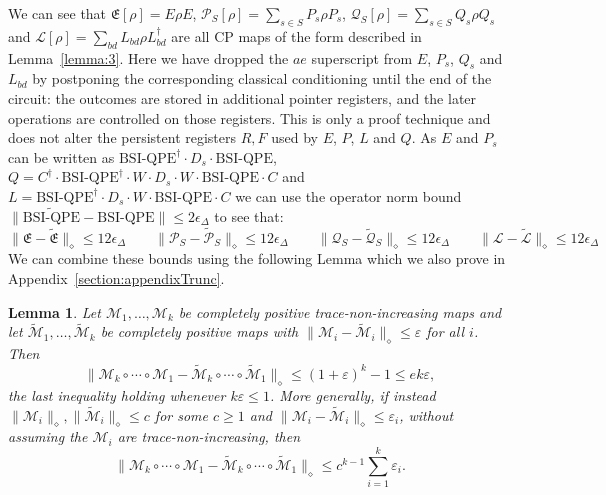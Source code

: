 \documentclass[aps,floatfix,10pt,amssymb,amsfont,amsmath,superscriptaddress,float,nofootinbib,longbibliography,nobalancelastpage,twocolumn]{revtex4-2}
\newtheorem{lemma}{Lemma}
\begin{document}
We can see that $\mathfrak{E}[\rho] =  E \rho E$, $\mathcal{P}_S[\rho] = \sum_{s\in S} P_s \rho P_s$, $\mathcal{Q}_S[\rho] = \sum_{s\in S} Q_s \rho Q_s$ and $\mathcal{L}[\rho] = \sum_{bd} L_{bd} \rho L^{\dagger}_{bd}$ are all CP maps of the form described in Lemma~\ref{lemma:3}. Here we have dropped the $ae$ superscript from $E$, $P_s$, $Q_s$ and $L_{bd}$ by postponing the corresponding classical conditioning until the end of the circuit: the outcomes are stored in additional pointer registers, and the later operations are controlled on those registers. This is only a proof technique and does not alter the persistent registers $R, F$ used by $E$, $P$, $L$ and $Q$. As $E$ and $P_s$ can be written as $\text{BSI-QPE}^{\dagger}\cdot D_s\cdot\text{BSI-QPE}$, $Q = C^{\dagger}\cdot\text{BSI-QPE}^{\dagger}\cdot W\cdot D_s\cdot W\cdot \text{BSI-QPE}\cdot C$ and $L = \text{BSI-QPE}^{\dagger}\cdot D_s\cdot W\cdot \text{BSI-QPE}\cdot C$ we can use the operator norm bound $\|\widetilde{\text{BSI-QPE}}- \text{BSI-QPE}\| \leq 2\epsilon_{\Delta}$ to see that:
\begin{equation}
    \|\mathfrak{E} - \tilde{\mathfrak{E}}\|_{\diamond} \leq 12\epsilon_{\Delta} \qquad\|\mathcal{P}_S - \tilde{\mathcal{P}}_S\|_{\diamond} \leq 12\epsilon_{\Delta} \qquad\|\mathcal{Q}_S - \tilde{\mathcal{Q}}_S\|_{\diamond} \leq 12\epsilon_{\Delta} \qquad\|\mathcal{L} - \tilde{\mathcal{L}}\|_{\diamond} \leq 12\epsilon_{\Delta}
    \label{eq:bound_on_component_maps}
\end{equation}
We can combine these bounds using the following Lemma which we also prove in Appendix~\ref{section:appendixTrunc}.
\begin{lemma}
\label{lemma:composition}
Let $\mathcal{M}_1, \ldots, \mathcal{M}_k$ be completely positive trace-non-increasing maps and let $\tilde{\mathcal{M}}_1, \ldots, \tilde{\mathcal{M}}_k$ be completely positive maps with $\|\mathcal{M}_i - \tilde{\mathcal{M}}_i\|_{\diamond} \leq \varepsilon$ for all $i$. Then
\begin{equation}
    \|\mathcal{M}_k \circ \cdots \circ \mathcal{M}_1 - \tilde{\mathcal{M}}_k \circ \cdots \circ \tilde{\mathcal{M}}_1\|_{\diamond} \leq (1+\varepsilon)^k - 1 \leq e k \varepsilon,
\end{equation}
the last inequality holding whenever $k\varepsilon \leq 1$. More generally, if instead $\|\mathcal{M}_i\|_{\diamond}, \|\tilde{\mathcal{M}}_i\|_{\diamond} \leq c$ for some $c \geq 1$ and $\|\mathcal{M}_i - \tilde{\mathcal{M}}_i\|_{\diamond} \leq \varepsilon_i$, without assuming the $\mathcal{M}_i$ are trace-non-increasing, then
\begin{equation}
    \|\mathcal{M}_k \circ \cdots \circ \mathcal{M}_1 - \tilde{\mathcal{M}}_k \circ \cdots \circ \tilde{\mathcal{M}}_1\|_{\diamond} \leq c^{k-1}\sum_{i=1}^{k}\varepsilon_i .
\end{equation}
\end{lemma}
\end{document}
